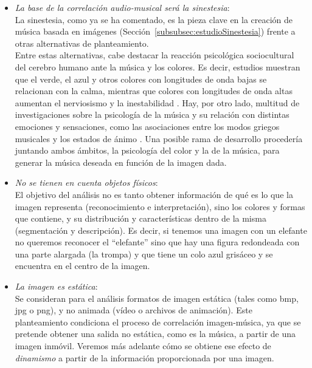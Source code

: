 		\begin{itemize}
		
		\item \emph{La base de la correlación audio-musical será la sinestesia}:
			\vspace{0.1in}
			\\La sinestesia, como ya se ha comentado, es la pieza clave en la creación de música basada en imágenes (Sección~\ref{subsubsec:estudioSinestesia}) frente a otras alternativas de planteamiento.\\
			Entre estas alternativas, cabe destacar la reacción psicológica sociocultural del cerebro humano ante la música y los colores. Es decir, estudios muestran que el verde, el azul y otros colores con longitudes de onda bajas se relacionan con la calma, mientras que colores con longitudes de onda altas aumentan el nerviosismo y la inestabilidad \cite{colorpsy}. Hay, por otro lado, multitud de investigaciones sobre la psicología de la música y su relación con distintas emociones y sensaciones, como las asociaciones entre los modos griegos musicales y los estados de ánimo \cite{micrologus}. Una posible rama de desarrollo procedería juntando ambos ámbitos, la psicología del color y la de la música, para generar la música deseada en función de la imagen dada.\\
		\item \emph{No se tienen en cuenta objetos físicos}:
			\vspace{0.1in}
			\\El objetivo del análisis no es tanto obtener información de qué es lo que la imagen representa (reconocimiento e interpretación), sino los colores y formas que contiene, y su distribución y características dentro de la misma (segmentación y descripción). Es decir, si tenemos una imagen con un elefante no queremos reconocer el ``elefante'' sino que hay una figura  redondeada con una parte alargada (la trompa) y que tiene un colo azul grisáceo y se encuentra en el centro de la imagen.
		\item \emph{La imagen es estática}:
			\vspace{0.1in}
			\\Se consideran para el análisis formatos de imagen estática (tales como bmp, jpg o png), y no animada (vídeo o archivos de animación). Este planteamiento condiciona el proceso de correlación imagen-música, ya que se pretende obtener una salida no estática, como es la música, a partir de una imagen inmóvil. Veremos más adelante cómo se obtiene ese efecto de \emph{dinamismo} a partir de la información proporcionada por una imagen.

\end{itemize}

